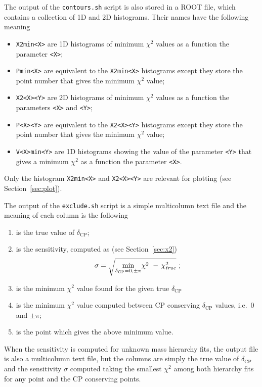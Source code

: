 \documentclass[a4paper, 11pt]{article}
\newcommand{\refsec}[1]{Section~\ref{#1}}
\begin{document}
The output of the \texttt{contours.sh} script is also stored in a ROOT file, which %
contains a collection of 1D and 2D histograms.
Their names have the following meaning
\begin{itemize}
	\item \texttt{X2min<X>} are 1D histograms of minimum $\chi^2$ values as a function %
		the parameter \texttt{<X>};
	\item \texttt{Pmin<X>} are equivalent to the \texttt{X2min<X>} histograms except they %
		store the point number that gives the minimum $\chi^2$ value;
	\item \texttt{X2<X><Y>} are 2D histograms of minimum $\chi^2$ values as a function %
		the parameters \texttt{<X>} and \texttt{<Y>};
	\item \texttt{P<X><Y>} are equivalent to the \texttt{X2<X><Y>} histograms except they %
		store the point number that gives the minimum $\chi^2$ value;
	\item \texttt{V<X>min<Y>} are 1D histograms showing the value of the parameter \texttt{<Y>} %
		that gives a minimum $\chi^2$ as a function the parameter \texttt{<X>}.
\end{itemize}
Only the histogram \texttt{X2min<X>} and \texttt{X2<X><Y>} are relevant for plotting (see \refsec{sec:plot}).

The output of the \texttt{exclude.sh} script is a simple multicolumn text file %
and the meaning of each column is the following
\begin{enumerate}
	\item is the true value of $\delta_\text{CP}$;
	\item is the sensitivity, computed as (see \refsec{sec:x2})
		\[
			\sigma = \sqrt{\min_{\delta_\text{CP} = 0,\pm\pi}\! \chi^2\  -\,\chi^2_\text{\emph{true}}}\ ;
		\]
	\item is the minimum $\chi^2$ value found for the given true $\delta_\text{CP}$
	\item is the minimum $\chi^2$ value computed between CP conserving $\delta_\text{CP}$ values, %
		i.e.\ $0$ and $\pm\pi$;
	\item is the point which gives the above minimum value.
\end{enumerate}
When the sensitivity is computed for unknown mass hierarchy fits, the output file is %
also a multicolumn text file, but the columns are simply the true value of $\delta_\text{CP}$ %
and the sensitivity $\sigma$ computed taking the smallest $\chi^2$ among both hierarchy fits %
for any point and the CP conserving points.
\end{document}
